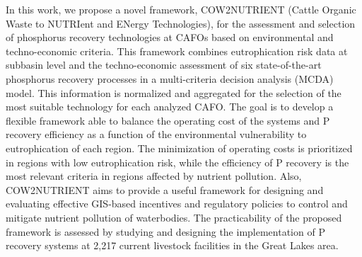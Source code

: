\documentclass[authoryear]{elsarticle}
\begin{document}
In this work, we propose a novel framework,
COW2NUTRIENT (Cattle Organic Waste to NUTRIent and ENergy Technologies),
for the assessment and selection of phosphorus recovery technologies at CAFOs based on environmental and techno-economic criteria.
This framework combines
eutrophication risk data at subbasin level and the techno-economic assessment of six state-of-the-art phosphorus recovery processes in a multi-criteria decision analysis (MCDA) model. This information is normalized and aggregated for the selection of the most suitable technology for each analyzed CAFO. The goal is to develop a flexible framework able to balance the operating cost of the systems and P recovery efficiency as a function of the environmental vulnerability to eutrophication of each region. The minimization of operating costs is prioritized in regions with low eutrophication risk, while the efficiency of P recovery is the most relevant criteria in regions affected by nutrient pollution. Also, COW2NUTRIENT aims to provide a useful framework for designing and evaluating effective GIS-based incentives and regulatory policies to control and mitigate nutrient pollution of waterbodies. The practicability of the proposed framework is assessed by studying and designing the implementation of P recovery systems at 2,217 current livestock facilities in the Great Lakes area.
\end{document}
